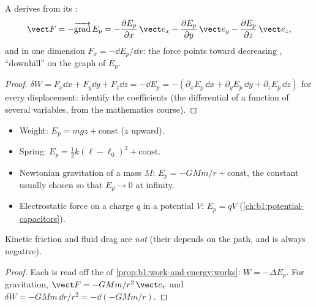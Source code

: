 \begin{proposition}\label{prop:b1:work-and-energy:gradient}
A  derives from its :
\[
\vect F = -\overrightarrow{\operatorname{grad}}\,E_p
= -\frac{\partial E_p}{\partial x}\,\vect e_x
- \frac{\partial E_p}{\partial y}\,\vect e_y
- \frac{\partial E_p}{\partial z}\,\vect e_z ,
\]
and in one dimension $F_x = -\dd E_p/\dd x$: the force points toward
decreasing , ``downhill'' on the graph of $E_p$.
\end{proposition}

\begin{proof}
$\delta W = F_x\dd x + F_y\dd y + F_z\dd z = -\dd E_p = -(\partial_xE_p\,\dd x
+ \partial_yE_p\,\dd y + \partial_zE_p\,\dd z)$ for every displacement:
identify the coefficients (the differential of a function of several
variables, from the mathematics course).
\end{proof}

\begin{proposition}\label{prop:b1:work-and-energy:eps}
\begin{itemize}
  \item Weight: $E_p = mgz + \text{const}$ ($z$ upward).
  \item Spring: $E_p = \tfrac12 k(\ell - \ell_0)^2 + \text{const}$.
  \item Newtonian gravitation of a mass $M$: $E_p = -GMm/r + \text{const}$,
        the constant usually chosen so that $E_p \to 0$ at infinity.
  \item Electrostatic force on a charge $q$ in a potential $V$:
        $E_p = qV$ (\cref{ch:b1:potential-capacitors}).
\end{itemize}
Kinetic friction and fluid drag are \emph{not}  (their 
depends on the path, and is always negative).
\end{proposition}

\begin{proof}
Each is read off the  of \cref{prop:b1:work-and-energy:works}:
$W = -\Delta E_p$. For gravitation, $\vect F = -GMm/r^2\,\vect e_r$ and
$\delta W = -GMm\,\dd r/r^2 = -\dd(-GMm/r)$.
\end{proof}

